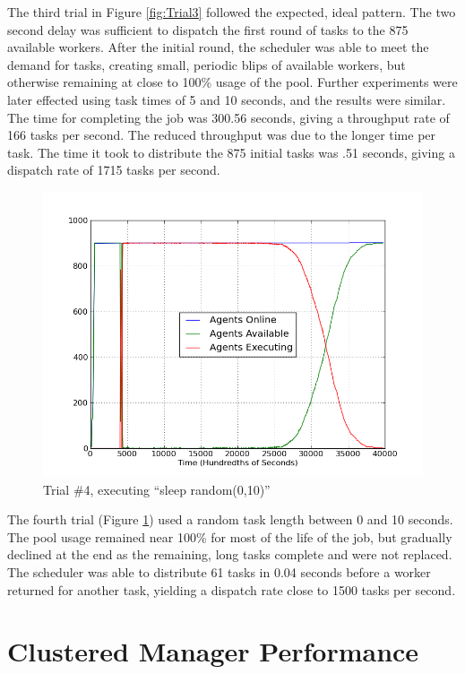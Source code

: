 The third trial in Figure \ref{fig:Trial3} followed the expected,
ideal pattern. The two second delay was sufficient to dispatch the
first round of tasks to the 875 available workers. After the initial
round, the scheduler was able to meet the demand for tasks, creating
small, periodic blips of available workers, but otherwise remaining
at close to 100\% usage of the pool. Further experiments were later
effected using task times of 5 and 10 seconds, and the results were
similar. The time for completing the job was 300.56 seconds, giving
a throughput rate of 166 tasks per second. The reduced throughput
was due to the longer time per task. The time it took to distribute
the 875 initial tasks was .51 seconds, giving a dispatch rate of 1715
tasks per second.

\begin{figure}
\includegraphics[width=\columnwidth]{figures/sleeprandom}
\caption{\label{fig:Trial4}Trial \#4, executing ``sleep random(0,10)''}
\end{figure}


The fourth trial (Figure \ref{fig:Trial4}) used a random task length
between 0 and 10 seconds. The pool usage remained near 100\% for most
of the life of the job, but gradually declined at the end as the remaining,
long tasks complete and were not replaced. The scheduler was able
to distribute 61 tasks in 0.04 seconds before a worker returned for
another task, yielding a dispatch rate close to 1500 tasks per second.

\section{Clustered Manager Performance}
\label{sec:Clustered-Performance}

